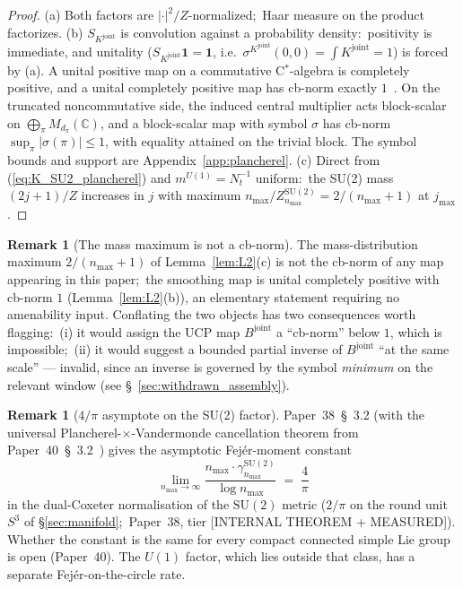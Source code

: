 \documentclass[11pt,a4paper]{article}
\theoremstyle{plain}
\theoremstyle{definition}
\newtheorem{remark}[theorem]{Remark}
\newcommand{\nmax}{n_{\max}}
\newcommand{\Nt}{N_{t}}
\newcommand{\sthree}{S^{3}}
\newcommand{\C}{\mathbb{C}}
\newcommand{\SU}{\mathrm{SU}}
\newcommand{\Uone}{U(1)}
\newcommand{\Mat}{M}
\newcommand{\Bjoint}{B^{\mathrm{joint}}}
\newcommand{\Kjoint}{K^{\mathrm{joint}}}
\newcommand{\gammaSU}{\gamma^{\SU(2)}}
\begin{document}
\begin{proof}
(a) Both factors are $|{\cdot}|^{2}/Z$-normalized;\ Haar measure on
the product factorizes. (b) $S_{\Kjoint}$ is convolution against a
probability density:\ positivity is immediate, and unitality
($S_{\Kjoint}\mathbf{1} = \mathbf{1}$, i.e.\
$\sigma^{\Kjoint}(0,0) = \int \Kjoint = 1$) is forced by (a). A
unital positive map on a commutative C$^{*}$-algebra is completely
positive, and a unital completely positive map has cb-norm exactly
$1$~\cite{paulsen2002}. On the truncated noncommutative side, the
induced central multiplier acts block-scalar on
$\bigoplus_{\pi} \Mat_{d_{\pi}}(\C)$, and a block-scalar map with
symbol $\sigma$ has cb-norm $\sup_{\pi}|\sigma(\pi)| \le 1$, with
equality attained on the trivial block. The symbol bounds and support
are Appendix~\ref{app:plancherel}. (c) Direct from
(\ref{eq:K_SU2_plancherel}) and $m^{\Uone} = \Nt^{-1}$ uniform:\ the
SU(2) mass $(2j+1)/Z$ increases in $j$ with maximum
$\nmax/Z^{\SU(2)}_{\nmax} = 2/(\nmax+1)$ at $j_{\max}$. \qedhere
\end{proof}

\begin{remark}[The mass maximum is not a cb-norm]\label{rem:cb_Nt_indep}
The mass-distribution maximum $2/(\nmax+1)$ of Lemma~\ref{lem:L2}(c)
is not the cb-norm of any map appearing in this paper;\ the smoothing
map is unital completely positive with cb-norm $1$
(Lemma~\ref{lem:L2}(b)), an elementary statement requiring no
amenability input. Conflating the two objects has two consequences
worth flagging:\ (i) it would assign the UCP map $\Bjoint$ a
``cb-norm'' below $1$, which is impossible;\ (ii) it would suggest a
bounded partial inverse of $\Bjoint$ ``at the same scale'' — invalid,
since an inverse is governed by the symbol \emph{minimum} on the
relevant window (see \S~\ref{sec:withdrawn_assembly}).
\end{remark}

\begin{remark}[$4/\pi$ asymptote on the SU(2) factor]\label{rem:4_pi}
Paper~38~\S~3.2 (with the universal Plancherel-$\times$-Vandermonde
cancellation theorem from Paper~40~\S~3.2~\cite{paper40_unified}) gives
the asymptotic Fej\'er-moment constant
\begin{equation*}
   \lim_{\nmax \to \infty} \frac{\nmax \cdot \gammaSU_{\nmax}}{\log \nmax}
   \;=\; \frac{4}{\pi}
\end{equation*}
in the dual-Coxeter normalisation of the $\SU(2)$ metric ($2/\pi$ on the
round unit $\sthree$ of \S\ref{sec:manifold};\ Paper~38, tier
[INTERNAL THEOREM + MEASURED]). Whether the constant is the same for
every compact connected simple Lie group is open (Paper~40). The $\Uone$ factor, which lies outside that class, has a
separate Fej\'er-on-the-circle rate.
\end{remark}
\end{document}
